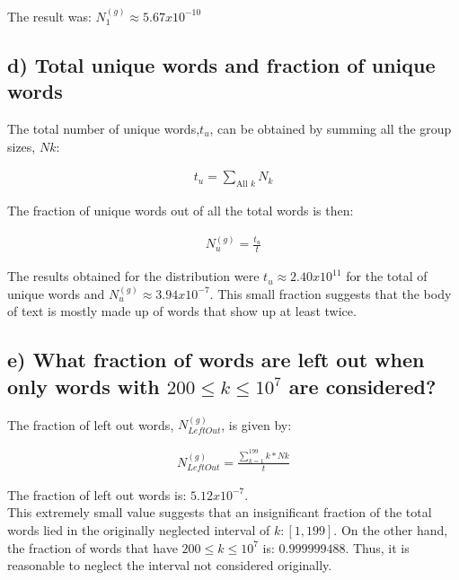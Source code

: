 \documentclass{article}
\begin{document}
The result was: $N_1^{(g)} \approx 5.67x10^{-10}$

\subsection{d) Total unique words and fraction of unique words}

The total number of unique words,$t_u$, can be obtained by summing all the group sizes, $Nk$:

\begin{align}
t_u = \sum_{\text{All }k} N_k
\end{align}

The fraction of unique words out of all the total words is then:

\begin{align}
N_u^{(g)} = \frac{t_u}{t}
\end{align}

The results obtained for the distribution were $t_u \approx 2.40x10^{11}$ for the total of unique words and $N_u^{(g)} \approx 3.94x10^{-7}$. This small fraction suggests that the body of text is mostly made up of words that show up at least twice.

\subsection{e) What fraction of words are left out when only words with $200 \leq k \leq10^7$ are considered?}

The fraction of left out words, $N_{LeftOut}^{(g)}$, is given by:

\begin{align}
N_{LeftOut}^{(g)}= \frac{\sum_{k=1}^{199}k*Nk}{t}
\end{align}

The fraction of left out words is: $5.12x10^{-7}$. \\

This extremely small value suggests that an insignificant fraction of the total words lied in the originally neglected interval of $k:[1,199]$. On the other hand, the fraction of words that have $200\leq k \leq 10^7$ is: $0.999999488$. Thus, it is reasonable to neglect the interval not considered originally.
\end{document}
